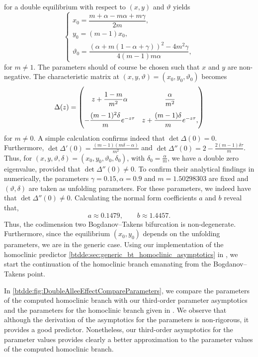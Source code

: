 for a double equilibrium with respect to $(x,y)$ and $\vartheta$ yields
\begin{equation}
    \begin{cases}
        x_0 = \dfrac{m+\alpha-m\alpha+m\gamma}{2m}, \\
        y_0 = (m-1)x_0, \\
        \vartheta_0 = \dfrac{(\alpha+m(1-\alpha+\gamma))^2 - 4m^2\gamma}{4(m-1)m\alpha},
    \end{cases}
\end{equation}
for $m\neq 1$. The parameters should of course be chosen such that $x$ and $y$
are non-negative. The characteristic matrix at
$(x,y,\vartheta)=(x_0,y_0,\vartheta_0)$ becomes
\[
\begingroup
\renewcommand*{\arraystretch}{2.5}
    \Delta(z) = \begin{pmatrix}
        z + \dfrac{1-m}{m^2}\alpha & \dfrac \alpha {m^2} \\
        -\dfrac{(m-1)^2\delta}m e^{-z\tau} & z + \dfrac{(m-1)\delta}m e^{-z\tau},
    \end{pmatrix}
\endgroup
\]
for $m\neq 0$. A simple calculation confirms indeed that $\det\Delta(0)=0$.
Furthermore, $\det\Delta'(0)=\frac{(m-1)(m\delta-\alpha)}{m^2}$ and
$\det\Delta''(0)=2 - \frac{2 (m-1) \delta\tau}{m}$. Thus, for
$(x,y,\vartheta,\delta)=(x_0,y_0,\vartheta_0,\delta_0)$, with $\delta_0 =
\frac\alpha m$, we have a double zero eigenvalue, provided that
$\det\Delta''(0) \neq 0$. To confirm their analytical findings in \cite{Jiao2021}
numerically, the parameters $\gamma=0.15,\alpha=0.9$ and $m=1.50298303$ are
fixed and $(\vartheta,\delta)$ are taken as unfolding parameters. For these
parameters, we indeed have that $\det\Delta''(0) \neq 0$. Calculating the normal
form coefficients $a$ and $b$ reveal that,
\[
a \approx 0.1479, \qquad b \approx 1.4457.
\]
Thus, the codimension two Bogdanov--Takens bifurcation is non-degenerate.
Furthermore, since the equilibrium $(x_0,y_0)$ depends on the unfolding
parameters, we are in the generic case. Using our implementation of the
homoclinic predictor \cref{btdde:sec:generic_bt_homoclinic_asymptotics} in
\DDEBIFTOOL, we start the continuation of the homoclinic branch emanating from
the Bogdanov--Takens point.

In \cref{btdde:fig:DoubleAlleeEffectCompareParameters}, we compare the parameters of
the computed homoclinic branch with our third-order parameter asymptotics and
the parameters for the homoclinic branch given in \cite{Jiao2021}. We observe
that although the derivation of the asymptotics for the parameters is
non-rigorous, it provides a good predictor. Nonetheless, our third-order
asymptotics for the parameter values provides clearly a better approximation to
the parameter values of the computed homoclinic branch.

